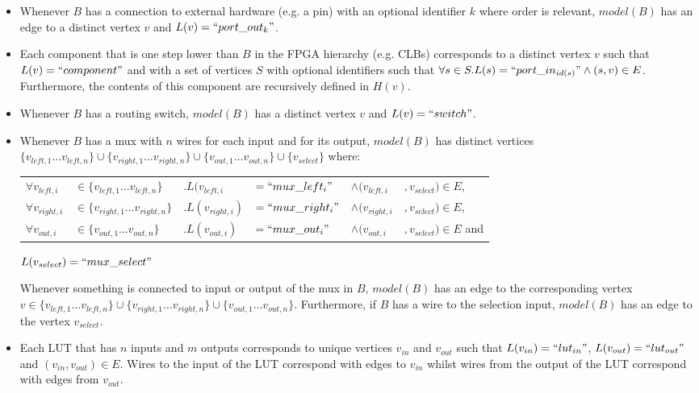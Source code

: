 \begin{itemize}
\item Whenever $B$ has a connection to external hardware (e.g. a pin) with an optional identifier $k$ where order is relevant, $model(B)$ has an edge to a distinct vertex $v$ and $L(v)=``port\_out_k"$.

\item Each component that is one step lower than $B$ in the FPGA hierarchy (e.g. CLBs) corresponds to a distinct vertex $v$ such that $L(v)=``component"$ and with a set of vertices $S$ with optional identifiers such that $\forall s \in S . L(s)=``port\_in_{id(s)}" \land (s,v) \in E$. Furthermore, the contents of this component are recursively defined in $H(v)$.

\item Whenever $B$ has a routing switch, $model(B)$ has a distinct vertex $v$ and $L(v)=``switch"$.

\item Whenever $B$ has a mux with $n$ wires for each input and for its output, $model(B)$ has distinct vertices $\{v_{left, 1} \dots v_{left, n}\} \cup \{v_{right, 1} \dots v_{right, n}\} \cup \{v_{out, 1} \dots v_{out, n}\} \cup \{v_{select}\}$ where:

\begingroup
\setlength{\tabcolsep}{2pt} %
\begin{tabular}{llllll}
$\forall v_{left, i}$ & $\in \{v_{left, 1} \dots v_{left, n}\}$ & $. L(v_{left, i}$&$= ``mux\_left_i"$&$\land (v_{left, i}$&$, v_{select}) \in E$,\\
$\forall v_{right, i}$ & $\in \{v_{right, 1} \dots v_{right, n}\}$ & $. L(v_{right, i})$&$= ``mux\_right_i"$&$\land (v_{right, i}$&$, v_{select}) \in E$,\\
$\forall v_{out, i}$ & $\in \{v_{out, 1} \dots v_{out, n}\}$ & $. L(v_{out, i}) $&$= ``mux\_out_i"$&$\land (v_{out, i}$&$, v_{select}) \in E$ and
\end{tabular}
\endgroup

$L(v_{select})=``mux\_select"$

Whenever something is connected to input or output of the mux in $B$, $model(B)$ has an edge to the corresponding vertex $v \in \{v_{left, 1} \dots v_{left, n}\} \cup \{v_{right, 1} \dots v_{right, n}\} \cup \{v_{out, 1} \dots v_{out, n}\}$. Furthermore, if $B$ has a wire to the selection input, $model(B)$ has an edge to the vertex $v_{select}$.

\item Each LUT that has $n$ inputs and $m$ outputs corresponds to unique vertices $v_{in}$ and $v_{out}$ such that $L(v_{in})=``lut_{in}"$, $L(v_{out})=``lut_{out}"$ and $(v_{in}, v_{out}) \in E$. Wires to the input of the LUT correspond with edges to $v_{in}$ whilst wires from the output of the LUT correspond with edges from $v_{out}$.


\end{itemize}
